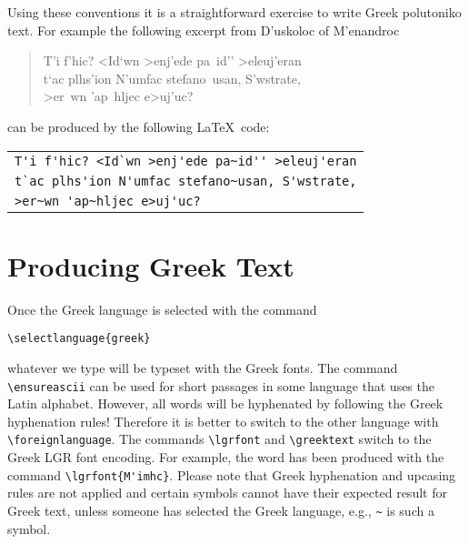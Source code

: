 \documentclass[11pt]{article}
\newcommand{\langGreek}{\foreignlanguage{greek}}
\newcommand{\sg}{\selectlanguage{greek}}
\newcommand{\sa}{\selectlanguage{american}}
\begin{document}
Using these conventions it is a straightforward exercise to write Greek
\langGreek{polutoniko} text. For example the following excerpt from
\langGreek{D'uskoloc} of \langGreek{M'enandroc}
\sg
\begin{quote}
T'i f'hic? <Id`wn >enj'ede pa~id'' >eleuj'eran\\
t`ac plhs'ion N'umfac stefano~usan, S'wstrate,\\
>er~wn 'ap~hljec e>uj'uc?
\end{quote}
\sa can be produced by the following \LaTeX\ code:
\begin{center}
\begin{tabular}{l}
\verb+T'i f'hic? <Id`wn >enj'ede pa~id'' >eleuj'eran+\\
\verb+t`ac plhs'ion N'umfac stefano~usan, S'wstrate,+\\
\verb+>er~wn 'ap~hljec e>uj'uc?+
\end{tabular}
\end{center}
\section{Producing Greek Text}
Once the Greek language is selected with the command
\begin{center}
\verb+\selectlanguage{greek}+
\end{center}
whatever we type will be typeset with the Greek fonts. The command
\verb+\ensureascii+ can be used for short passages in some language that
uses the Latin alphabet.
However, all words will be hyphenated by following the Greek hyphenation
rules! Therefore it is better to switch to the other language
with \verb+\foreignlanguage+. The commands \verb+\lgrfont+ and
\verb+\greektext+ switch to the Greek LGR font encoding.
For example, the word  has been produced with the command
\verb+\lgrfont{M'imhc}+. Please note that Greek hyphenation and upcasing rules
are not applied and certain symbols cannot have
their expected result for Greek text, unless someone has selected the Greek
language, e.g., \verb+~+ is such a symbol.
\end{document}
